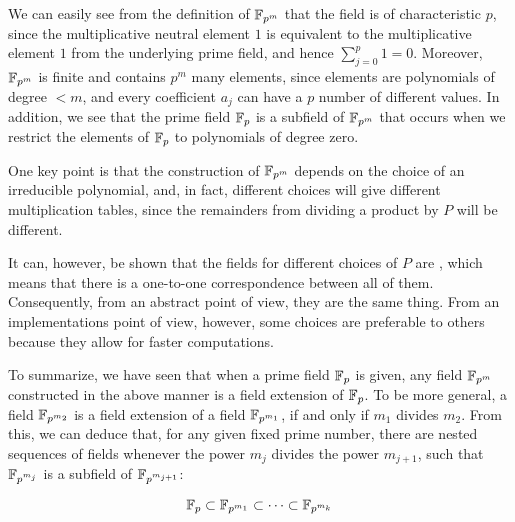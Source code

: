 We can easily see from the definition of $\mathbb{F}_{p^m}$ that the field is of characteristic $p$, since the multiplicative neutral element $1$ is equivalent to the multiplicative element $1$ from the underlying prime field, and hence $\sum_{j=0}^p 1=0$. Moreover, $\mathbb{F}_{p^m}$ is finite and contains $p^m$ many elements, since elements are polynomials of degree $<m$, and every coefficient $a_j$ can have a $p$ number of different values. In addition, we see that the prime field $\mathbb{F}_p$ is a subfield of $\mathbb{F}_{p^m}$ that occurs when we restrict the elements of $\mathbb{F}_{p}$ to polynomials of degree zero.

One key point is that the construction of $\mathbb{F}_{p^m}$ depends on the choice of an irreducible polynomial, and, in fact, different choices will give different multiplication tables, since the remainders from dividing a product by $P$ will be different.

It can, however, be shown that the fields for different choices of $P$ are , which means that there is a one-to-one correspondence between all of them. Consequently, from an abstract point of view, they are the same thing. From an implementations point of view, however, some choices are preferable to others because they allow for faster computations.

To summarize, we have seen that when a prime field $\mathbb{F}_p$ is given, any field
$\mathbb{F}_{p^m}$ constructed in the above manner is a field extension of $\mathbb{F}_p$. To be more general, a field $\mathbb{F}_{p^{m_2}}$ is a field extension of a field $\mathbb{F}_{p^{m_1}}$, if and only if $m_1$ divides $m_2$. From this, we can deduce that, for any given fixed prime number, there are nested sequences of fields whenever the power $m_j$ divides the power $m_{j+1}$, such that $\mathbb{F}_{p^{m_j}}$ is a subfield of $\mathbb{F}_{p^{m_{j+1}}}$:

\begin{equation}
\mathbb{F}_p \subset \mathbb{F}_{p^{m_1}} \subset \cdots \subset \mathbb{F}_{p^{m_k}}
\end{equation}

